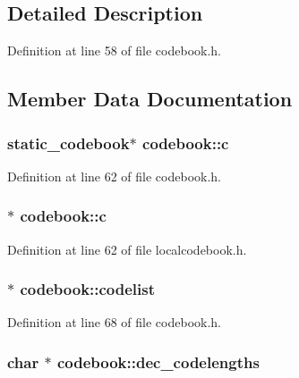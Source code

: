 \subsection{Detailed Description}


Definition at line 58 of file codebook.\+h.



\subsection{Member Data Documentation}
\subsubsection[{\texorpdfstring{c}{c}}]{ {\bf static\+\_\+codebook}$\ast$ codebook\+::c}\hypertarget{structcodebook_ad3f2dd8f3ad3efffbb5f60d467133ab0}{}\label{structcodebook_ad3f2dd8f3ad3efffbb5f60d467133ab0}


Definition at line 62 of file codebook.\+h.

\subsubsection[{\texorpdfstring{c}{c}}]{$\ast$ codebook\+::c}\hypertarget{structcodebook_a5fa8f287f190d6cffc282dbe3449c60c}{}\label{structcodebook_a5fa8f287f190d6cffc282dbe3449c60c}


Definition at line 62 of file localcodebook.\+h.

\subsubsection[{\texorpdfstring{codelist}{codelist}}]{ $\ast$ codebook\+::codelist}\hypertarget{structcodebook_a2ea951b8092a4a68551bbd9728fc86af}{}\label{structcodebook_a2ea951b8092a4a68551bbd9728fc86af}


Definition at line 68 of file codebook.\+h.

\subsubsection[{\texorpdfstring{dec\+\_\+codelengths}{dec_codelengths}}]{\setlength{\rightskip}{0pt plus 5cm}char $\ast$ codebook\+::dec\+\_\+codelengths}\hypertarget{structcodebook_aad33e74f39a1b209834804a8d28031c2}{}\label{structcodebook_aad33e74f39a1b209834804a8d28031c2}


